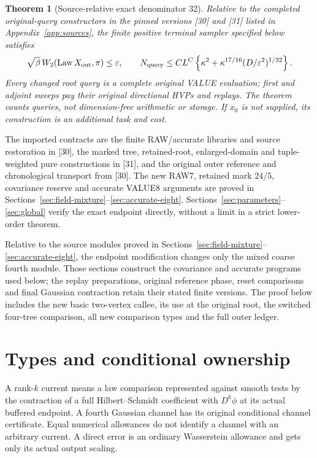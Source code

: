 \documentclass[11pt]{article}
\numberwithin{equation}{section}
\newtheorem{theorem}{Theorem}[section]
\theoremstyle{remark}\newtheorem{remark}[theorem]{Remark}
\newcommand{\Law}{\operatorname{Law}}\newcommand{\Lip}{\operatorname{Lip}}
\begin{document}
\begin{theorem}[Source-relative exact denominator 32]
\label{thm:main}
Relative to the completed original-query constructors in the pinned versions [30] and [31] listed in Appendix~\ref{app:sources}, the finite positive terminal sampler specified below satisfies
\begin{equation}\label{eq:main}
 \sqrt\beta\,W_2(\Law X_{\rm out},\pi)\le\varepsilon,
 \qquad
 N_{\rm query}\le C L^C
 \left\{\kappa^2+\kappa^{17/16}(D/\varepsilon^2)^{1/32}\right\}.
\end{equation}
Every changed root query is a complete original VALUE evaluation; first and adjoint sweeps pay their original directional HVPs and replays. The theorem counts queries, not dimension-free arithmetic or storage. If $x_0$ is not supplied, its construction is an additional task and cost.
\end{theorem}

The imported contracts are the finite RAW/accurate libraries and source restoration in [30], the marked tree, retained-root, enlarged-domain and tuple-weighted pure constructions in [31], and the original outer reference and chronological transport from [30]. The new RAW7, retained mark $24/5$, covariance reserve and accurate VALUE8 arguments are proved in Sections~\ref{sec:field-mixture}--\ref{sec:accurate-eight}. Sections~\ref{sec:parameters}--\ref{sec:global} verify the exact endpoint directly, without a limit in a strict lower-order theorem.

Relative to the source modules proved in Sections~\ref{sec:field-mixture}--\ref{sec:accurate-eight}, the endpoint modification changes only the mixed coarse fourth module. Those sections construct the covariance and accurate programs used below; the replay preparations, original reference phase, reset comparisons and final Gaussian contraction retain their stated finite versions. The proof below includes the new basic two-vertex callee, its use at the original root, the switched four-tree comparison, all new comparison types and the full outer ledger.

\section{Types and conditional ownership}
\label{sec:types}
A rank-$k$ current means a law comparison represented against smooth tests by the contraction of a full Hilbert--Schmidt coefficient with $D^k\phi$ at its actual buffered endpoint. A fourth Gaussian channel has its original conditional channel certificate. Equal numerical allowances do not identify a channel with an arbitrary current. A direct error is an ordinary Wasserstein allowance and gets only its actual output scaling.
\end{document}
